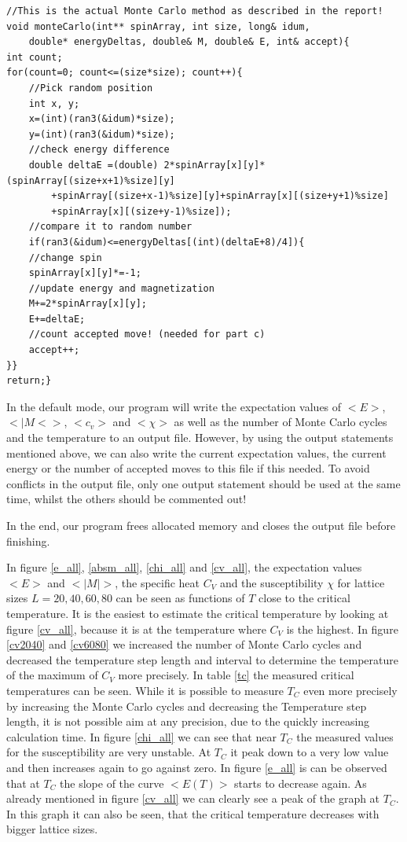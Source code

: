 \documentclass[10pt,a4paper]{article}
\begin{document}
\begin{lstlisting}
//This is the actual Monte Carlo method as described in the report!
void monteCarlo(int** spinArray, int size, long& idum,
	double* energyDeltas, double& M, double& E, int& accept){
int count;
for(count=0; count<=(size*size); count++){
	//Pick random position
	int x, y;
	x=(int)(ran3(&idum)*size);
	y=(int)(ran3(&idum)*size);
	//check energy difference
	double deltaE =(double) 2*spinArray[x][y]*(spinArray[(size+x+1)%size][y]
		+spinArray[(size+x-1)%size][y]+spinArray[x][(size+y+1)%size]
		+spinArray[x][(size+y-1)%size]);
	//compare it to random number
	if(ran3(&idum)<=energyDeltas[(int)(deltaE+8)/4]){
	//change spin
	spinArray[x][y]*=-1;
	//update energy and magnetization
	M+=2*spinArray[x][y];
	E+=deltaE;
	//count accepted move! (needed for part c)
	accept++;
}}
return;}
\end{lstlisting}

In the default mode, our program will write the expectation values of $<E>$, $<|M<>$, $<c_v>$ and $<\chi>$ as well as the number of Monte Carlo cycles and the temperature to an output file. However, by using the output statements mentioned above, we can also write the current expectation values, the current energy or the number of accepted moves to this file if this needed. To avoid conflicts in the output file, only one output statement should be used at the same time, whilst the others should be commented out!

In the end, our program frees allocated memory and closes the output file before finishing.



In figure \ref{e_all}, \ref{absm_all}, \ref{chi_all} and \ref{cv_all}, the expectation values $<E>$ and $<|M|>$, the specific heat $C_V$ and the susceptibility $\chi$ for lattice sizes $L = 20, 40, 60, 80$ can be seen as functions of $T$ close to the critical temperature. It is the easiest to estimate the critical temperature by looking at figure \ref{cv_all}, because it is at the temperature where $C_V$ is the highest. In figure \ref{cv2040} and \ref{cv6080} we increased the number of Monte Carlo cycles and decreased the temperature step length and interval to determine the temperature of the maximum of $C_V$ more precisely. In table \ref{tc} the measured critical temperatures can be seen. While it is possible to measure $T_C$ even more precisely by increasing the Monte Carlo cycles and decreasing the Temperature step length, it is not possible aim at any precision, due to the quickly increasing calculation time. 
In figure \ref{chi_all} we can see that near $T_C$ the measured values for the susceptibility are very unstable. At $T_C$ it peak down to a very low value and then increases again to go against zero. In figure \ref{e_all} is can be observed that at $T_C$ the slope of the curve $<E(T)>$ starts to decrease again. As already mentioned in figure \ref{cv_all} we can clearly see a peak of the graph at $T_C$. In this graph it can also be seen, that the critical temperature decreases with bigger lattice sizes. 
\end{document}
